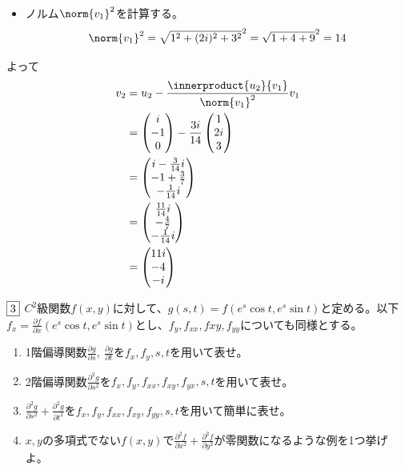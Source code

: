 \documentclass[dvipdfmx]{jsreport}
\begin{document}
\begin{souanswer}
\begin{enumerate}
\begin{itemize}
	\item ノルム$\norm{v_1}^2$を計算する。
\begin{equation*}
	\norm{v_1}^2= \sqrt{1^2+ (2i)^2+ 3^2}^2= \sqrt{1+ 4+ 9}^2= 14
\end{equation*}
\end{itemize}
	よって
\begin{align*}
	v_2
	&= u_2- \frac{\innerproduct{u_2}{v_1}}{\norm{v_1}^2}v_1\\
	&= \begin{pmatrix}i\\ -1\\ 0\end{pmatrix}- \frac{3i}{14}\begin{pmatrix}1\\ 2i\\ 3\end{pmatrix}\\
	&= \begin{pmatrix}i- \frac{3}{14}i\\ -1+ \frac{3}{7}\\ -\frac{1}{14}i\end{pmatrix}\\
	&= \begin{pmatrix}\frac{11}{14}i\\ -\frac{4}{7}\\ -\frac{1}{14}i\end{pmatrix}\\
	&= \begin{pmatrix}11i\\ -4\\ -i\end{pmatrix}
\end{align*}
\end{enumerate}
\end{souanswer}

\begin{tcolorbox} %
	$\fbox{3}$ $C^2$級関数$f(x, y)$に対して、$g(s, t)= f(e^s \cos{t}, e^s \sin{t})$と定める。以下$f_x= \frac{\partial f}{\partial x}(e^s \cos{t}, e^s \sin{t})$とし、$f_y, f_{xx}, f{xy}, f_{yy}$についても同様とする。
\begin{enumerate}
	\item 1階偏導関数$\frac{\partial g}{\partial s},\ \frac{\partial g}{\partial t}$を$f_x, f_y, s, t$を用いて表せ。
	\item 2階偏導関数$\frac{\partial^2 g}{\partial s^2}$を$f_x, f_y, f_{xx}, f_{xy}, f_{yx}, s, t$を用いて表せ。
	\item $\frac{\partial^2 g}{\partial s^2}+ \frac{\partial^2 g}{\partial t^2}$を$f_x, f_y, f_{xx}, f_{xy}, f_{yy}, s, t$を用いて簡単に表せ。
	\item $x, y$の多項式でない$f(x, y)$で$\frac{\partial^2 f}{\partial x^2}+ \frac{\partial^2 f}{\partial y^2}$が零関数になるような例を1つ挙げよ。
\end{enumerate}
\end{tcolorbox}
\end{document}
